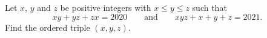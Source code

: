 Let $x$, $y$ and $z$ be positive integers with $x\le y\le z$ such that
\[xy+yz+zx=2020\qquad\text{and}\qquad xyz+x+y+z=2021.\]
Find the ordered triple $(x,y,z)$.
